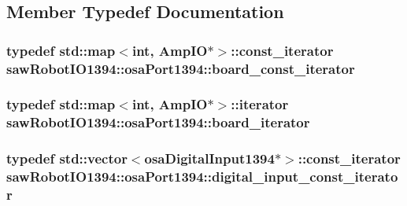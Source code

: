 \subsection{Member Typedef Documentation}
\hypertarget{classsaw_robot_i_o1394_1_1osa_port1394_a31632fbc6a8e493a8a1e0e48208f43d0}{
\subsubsection[{board\-\_\-const\-\_\-iterator}]{\setlength{\rightskip}{0pt plus 5cm}typedef std\-::map$<$int, Amp\-I\-O$\ast$$>$\-::const\-\_\-iterator {\bf saw\-Robot\-I\-O1394\-::osa\-Port1394\-::board\-\_\-const\-\_\-iterator}\hspace{0.3cm}{\ttfamily [protected]}}}\label{classsaw_robot_i_o1394_1_1osa_port1394_a31632fbc6a8e493a8a1e0e48208f43d0}
\hypertarget{classsaw_robot_i_o1394_1_1osa_port1394_ab2ec914caff42e3180aff52b41643292}{
\subsubsection[{board\-\_\-iterator}]{\setlength{\rightskip}{0pt plus 5cm}typedef std\-::map$<$int, Amp\-I\-O$\ast$$>$\-::iterator {\bf saw\-Robot\-I\-O1394\-::osa\-Port1394\-::board\-\_\-iterator}\hspace{0.3cm}{\ttfamily [protected]}}}\label{classsaw_robot_i_o1394_1_1osa_port1394_ab2ec914caff42e3180aff52b41643292}
\hypertarget{classsaw_robot_i_o1394_1_1osa_port1394_ad95ebd8e21bd3394aaa54a24ba424d7c}{
\subsubsection[{digital\-\_\-input\-\_\-const\-\_\-iterator}]{\setlength{\rightskip}{0pt plus 5cm}typedef std\-::vector$<${\bf osa\-Digital\-Input1394}$\ast$$>$\-::const\-\_\-iterator {\bf saw\-Robot\-I\-O1394\-::osa\-Port1394\-::digital\-\_\-input\-\_\-const\-\_\-iterator}\hspace{0.3cm}{\ttfamily [protected]}}}\label{classsaw_robot_i_o1394_1_1osa_port1394_ad95ebd8e21bd3394aaa54a24ba424d7c}
